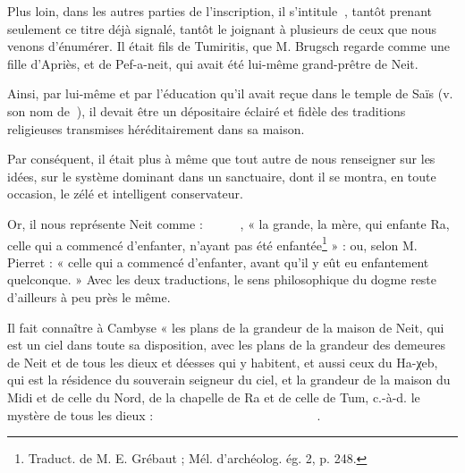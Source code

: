 \documentclass[a4paper, 11pt, oneside]{article}
\newcommand*\hieroAAAH{}
\newcommand*\hieroAAAO{}
\newcommand*\hieroAAAU{}
\newcommand*\hieroAAAX{}
\newcommand*\hieroAABC{\raisebox{0.5ex}{}}
\newcommand*\hieroAABR{}
\newcommand*\hieroAACM{}
\newcommand*\hieroAACN{\raisebox{1ex}{}}
\newcommand*\hieroAACS{}
\newcommand*\hieroAAEK{}
\newcommand*\hieroAAEZ{}
\newcommand*\hieroAAFW{}
\newcommand*\hieroAAHA{}
\newcommand*\hieroAAHN{}
\newcommand*\hieroAAHQ{}
\newcommand*\hieroAAHR{}
\newcommand*\hieroAAHU{}
\newcommand*\hieroAAHV{}
\newcommand*\hieroAAHW{}
\newcommand*\hieroAAHX{}
\newcommand*\hieroAAHY{}
\newcommand*\hieroAAHZ{}
\newcommand*\hieroAAIA{\raisebox{0.3ex}{}}
\newcommand*\hieroAAID{}
\newcommand*\hieroAAIE{}
\newcommand*\hieroAAIF{}
\newcommand*\hieroAAIG{}
\newcommand*\hieroAAIH{}
\newcommand*\hieroAAKN{}
\newcommand*\hieroAAKO{}
\newcommand*\hieroAANC{}
\newcommand*\hieroAAOX{}
\newcommand*\hieroAAPH{}
\newcommand*\hieroABAM{}
\newcommand*\hieroABAW{}
\newcommand*\hieroABBK{}
\newcommand*\hieroABBL{}
\newcommand*\hieroABBM{}
\newcommand*\hieroABBN{}
\newcommand*\hieroABBO{}
\begin{document}
Plus loin, dans les autres parties de l'inscription, il s'intitule $\hieroAAOX\:\hieroABAW$, tantôt prenant seulement ce titre déjà signalé, tantôt le joignant à plusieurs de ceux que nous venons d'énumérer. Il était fils de Tumiritis, que M. Brugsch regarde comme une fille d'Apriès, et de Pef-a-neit, qui avait été lui-même grand-prêtre de Neit.

Ainsi, par lui-même et par l'éducation qu'il avait reçue dans le temple de Saïs (v. son nom de $\hieroAAAX\:\hieroAAID$), il devait être un dépositaire éclairé et fidèle des traditions religieuses transmises héréditairement dans sa maison.

Par conséquent, il était plus à même que tout autre de nous renseigner sur les idées, sur le système dominant dans un sanctuaire, dont il se montra, en toute occasion, le zélé et intelligent conservateur.

Or, il nous représente Neit comme : $\hieroAAOX\:\hieroAAKO\:\hieroAANC\allowbreak\:\hieroAACS\:\hieroAAIF\:\hieroABAM\allowbreak\:\hieroAANC\:\hieroAACS\:\hieroAAAH\allowbreak\:\hieroAACM\:\hieroABBK\allowbreak\:\hieroAANC\:\hieroAACS$, « la grande, la mère, qui enfante Ra, celle qui a commencé d'enfanter, n'ayant pas été enfantée\footnote{Traduct. de M. E. Grébaut ; Mél. d'archéolog. ég. 2, p. 248.} » : ou, selon M. Pierret : « celle qui a commencé d'enfanter, avant qu'il y eût eu enfantement quelconque. » Avec les deux traductions, le sens philosophique du dogme reste d'ailleurs à peu près le même.

Il fait connaître à Cambyse « les plans de la grandeur de la maison de Neit, qui est un ciel dans toute sa disposition, avec les plans de la grandeur des demeures de Neit et de tous les dieux et déesses qui y habitent, et aussi ceux du Ha-χeb, qui est la résidence du souverain seigneur du ciel, et la grandeur de la maison du Midi et de celle du Nord, de la chapelle de Ra et de celle de Tum, c.-à-d. le mystère de tous les dieux : $\hieroAACS\:\hieroAAHR\:\hieroABBL\allowbreak\:\hieroABBM\:\hieroAAHQ\:\hieroAABR\allowbreak\:\hieroAACS\:\hieroAAHR\:\hieroAACS\allowbreak\:\hieroAABC\:\hieroAAEZ\:\hieroAAKN\allowbreak\:\hieroAACS\:\hieroAAHR\:\hieroABBL\allowbreak\:\hieroAACN\:\hieroAAAO\:\hieroAAHA\allowbreak\:\hieroAAEK\:\hieroAAEK\:\hieroAAEK\allowbreak\:\hieroAAHV\:\hieroAABC\:\hieroAAAH\allowbreak\:\hieroAAHW\:\hieroAAHX\:\hieroAAAH\allowbreak\:\hieroAACS\:\hieroAAEZ\:\hieroAAKN\allowbreak\:\hieroAACS\:\hieroAAHR\allowbreak\:\hieroABBL\:\hieroAACN\:\hieroAAFW\allowbreak\:\hieroAAHY\:\hieroAAAU\:\hieroAAHZ\allowbreak\:\hieroAAIA\:\hieroABBN\allowbreak\:\hieroAABC\:\hieroAAPH\:\hieroAAEZ\allowbreak\:\hieroAAKN\:\hieroAACS\:\hieroAAHR\allowbreak\:\hieroAAHU\:\hieroAAAX\:\hieroAAID\allowbreak\:\hieroAAIE\:\hieroAAHN\:\hieroAAIF\allowbreak\:\hieroAAHN\:\hieroAAIG\:\hieroAAIH\allowbreak\:\hieroAAHZ\:\hieroABBO\:\hieroAABC$.
\end{document}
